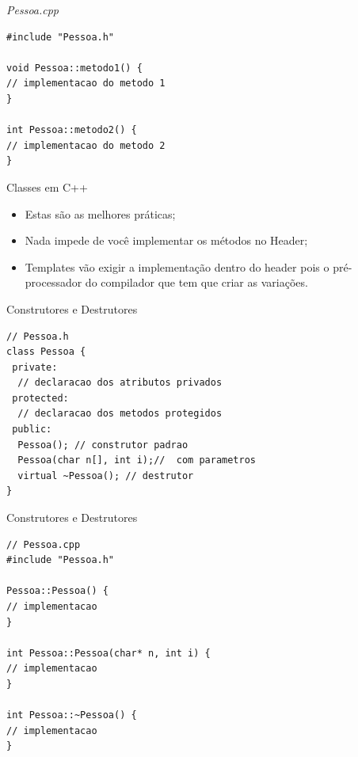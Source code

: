 \documentclass[12pt,table,xcolor={dvipsnames}]{beamer}
\begin{document}
\begin{frame}[fragile]{\textit{Pessoa.cpp}}
\begin{lstlisting}
#include "Pessoa.h"

void Pessoa::metodo1() {
// implementacao do metodo 1
}

int Pessoa::metodo2() {
// implementacao do metodo 2
}
\end{lstlisting}
\end{frame}

\begin{frame}{Classes em C++}
\begin{itemize}
\item Estas são as melhores práticas;
\item Nada impede de você implementar os métodos no Header;
\item Templates vão exigir a implementação dentro do header pois o pré-processador do compilador que tem que criar as variações.
\end{itemize}
\end{frame}

\begin{frame}[fragile]{Construtores e Destrutores}
\begin{lstlisting}
// Pessoa.h
class Pessoa {
 private:
  // declaracao dos atributos privados
 protected:
  // declaracao dos metodos protegidos
 public:
  Pessoa(); // construtor padrao
  Pessoa(char n[], int i);//  com parametros
  virtual ~Pessoa(); // destrutor
}
\end{lstlisting}
\end{frame}

\begin{frame}[fragile]{Construtores e Destrutores}
\begin{lstlisting}
// Pessoa.cpp
#include "Pessoa.h"

Pessoa::Pessoa() {
// implementacao
}

int Pessoa::Pessoa(char* n, int i) {
// implementacao
}

int Pessoa::~Pessoa() {
// implementacao
}
\end{lstlisting}
\end{frame}
\end{document}
